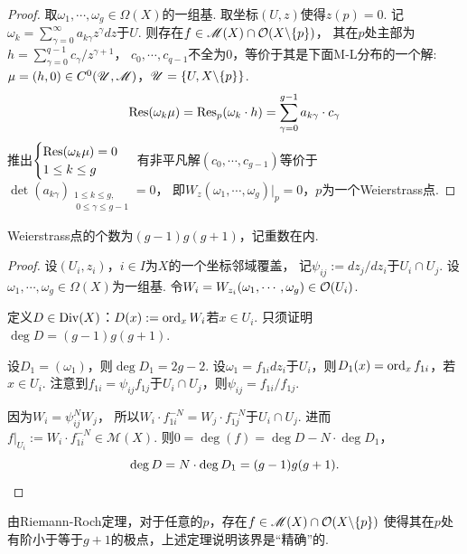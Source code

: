 \begin{proof}
	取$\omega_1,\cdots,\omega_g\in \Omega(X)$的一组基. 取坐标$(U,z)$使得$z(p)=0$. 
    记$\omega_k=\sum\limits_{\gamma=0}^\infty a_{k\gamma}z^\gamma dz$于$U$. 
    则存在$f\in \mathscr{M}(X)\cap \mathcal{O}(X\backslash \{p\})$，
    其在$p$处主部为$h=\sum\limits_{\gamma=0}^{q-1} c_\gamma/z^{\gamma+1}$，
    $c_0,\cdots,c_{q-1}$不全为$0$，等价于其是下面M-L分布的一个解: 
    $\mu=(h,0)\in C^0(\mathscr{U},\mathscr{M})$，$\mathscr{U}=\{U,X\backslash \{p\}\}$. 
	$$\operatorname{Res}(\omega_k \mu)=\operatorname{Res}_p(\omega_k \cdot h)
    =\sum\limits_{\gamma=0}^{g-1} a_{k\gamma}\cdot c_\gamma$$
	推出$\begin{cases} \operatorname{Res}(\omega_k \mu)=0\\ 1\leq k\leq g\end{cases}$
    有非平凡解$(c_0,\cdots,c_{g-1})$等价于
    $\det(a_{k\gamma})_{\substack{\!\!\!\!1\leq k\leq g, \\\ 0\leq \gamma\leq g-1}}=0$，
    即$W_z(\omega_1,\cdots,\omega_g)|_p=0$，$p$为一个Weierstrass点.
\end{proof}

\begin{theorem}
	Weierstrass点的个数为$(g-1)g(g+1)$，记重数在内.
\end{theorem}

\begin{proof}
	设$(U_i,z_i)$，$i\in I$为$X$的一个坐标邻域覆盖，
    记$\psi_{ij}:=dz_j/dz_i$于$U_i\cap U_j$. 
    设$\omega_1,\cdots,\omega_g\in \Omega(X)$为一组基. 
    令$W_i=W_{z_i}(\omega_1,\cdots,\omega_g)\in \mathcal{O}(U_i)$.

	定义$D\in \operatorname{Div}(X)$：$D(x):=\operatorname{ord}_x W_i$若$x\in U_i$. 
    只须证明$\deg D=(g-1)g(g+1)$.

	设$D_1=(\omega_1)$，则$\deg D_1=2g-2$. 
    设$\omega_1=f_{1i}dz_i$于$U_i$，则$D_1(x)=\operatorname{ord}_x f_{1i}$，若$x\in U_i$. 
    注意到$f_{1i}=\psi_{ij}f_{1j}$于$U_i\cap U_j$，则$\psi_{ij}=f_{1i}/f_{1j}$.

	因为$W_i=\psi_{ij}^N W_j$，
    所以$W_i \cdot f_{1i}^{-N}=W_j\cdot f_{1j}^{-N}$于$U_i \cap U_j$. 
    进而$f|_{U_i}:=W_i \cdot f_{1i}^{-N}\in \mathscr{M}(X)$. 
    则$0=\deg (f)=\deg D-N\cdot \deg D_1$，
	$$\deg D=N\cdot \deg D_1=(g-1)g(g+1).\qedhere$$
\end{proof}

\begin{remark}
    由Riemann-Roch定理，对于任意的$p$，存在$f\in \mathscr{M}(X) \cap \mathcal{O}(X\backslash \{p\})$
    使得其在$p$处有阶小于等于$g+1$的极点，上述定理说明该界是“精确”的.
\end{remark}

